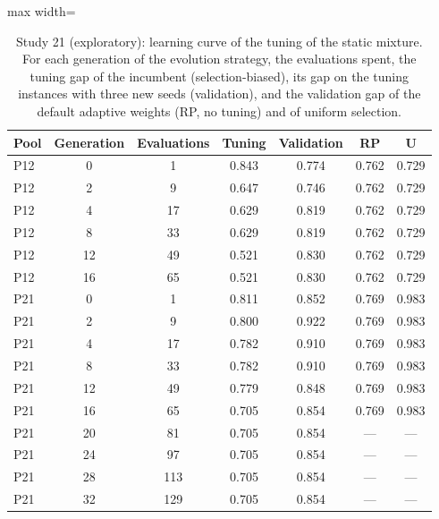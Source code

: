 \begin{table}[t]
\caption{Study 21 (exploratory): learning curve of the tuning of the static mixture. For each generation of the evolution strategy, the evaluations spent, the tuning gap of the incumbent (selection-biased), its gap on the tuning instances with three new seeds (validation), and the validation gap of the default adaptive weights (RP, no tuning) and of uniform selection.}\label{tab:s21c}
\centering
\small
\begin{adjustbox}{max width=\linewidth}
\begin{tabular}{lcccccc}
\toprule
Pool & Generation & Evaluations & Tuning & Validation & RP & U \\
\midrule
P12 & 0 & 1 & 0.843 & 0.774 & 0.762 & 0.729 \\
P12 & 2 & 9 & 0.647 & 0.746 & 0.762 & 0.729 \\
P12 & 4 & 17 & 0.629 & 0.819 & 0.762 & 0.729 \\
P12 & 8 & 33 & 0.629 & 0.819 & 0.762 & 0.729 \\
P12 & 12 & 49 & 0.521 & 0.830 & 0.762 & 0.729 \\
P12 & 16 & 65 & 0.521 & 0.830 & 0.762 & 0.729 \\
P21 & 0 & 1 & 0.811 & 0.852 & 0.769 & 0.983 \\
P21 & 2 & 9 & 0.800 & 0.922 & 0.769 & 0.983 \\
P21 & 4 & 17 & 0.782 & 0.910 & 0.769 & 0.983 \\
P21 & 8 & 33 & 0.782 & 0.910 & 0.769 & 0.983 \\
P21 & 12 & 49 & 0.779 & 0.848 & 0.769 & 0.983 \\
P21 & 16 & 65 & 0.705 & 0.854 & 0.769 & 0.983 \\
P21 & 20 & 81 & 0.705 & 0.854 & --- & --- \\
P21 & 24 & 97 & 0.705 & 0.854 & --- & --- \\
P21 & 28 & 113 & 0.705 & 0.854 & --- & --- \\
P21 & 32 & 129 & 0.705 & 0.854 & --- & --- \\
\bottomrule
\end{tabular}
\end{adjustbox}
\end{table}
